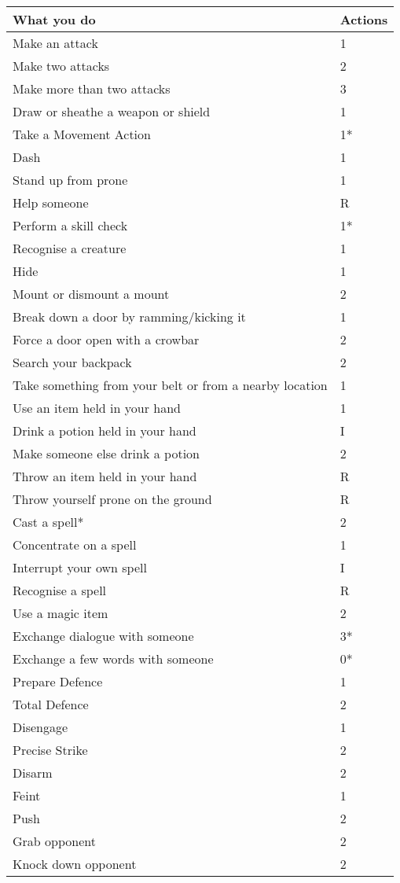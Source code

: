 \documentclass[landscape,10pt,a4paper]{article}
\begin{document}
\begin{multicols}{3}
\begin{dmbox}[title=Actions per Round - page \pageref{actionsintheround}]
\noindent\begin{tabular}{ll}
\textbf{What you do} & \textbf{Actions}\\
\hline
Make an attack& 1\\
Make two attacks& 2\\
Make more than two attacks& 3\\
Draw or sheathe a weapon or shield& 1\\
\hline
Take a Movement Action &1*\\
Dash & 1\\
Stand up from prone& 1\\
\hline
Help someone& R\\
Perform a skill check& 1*\\
Recognise a creature& 1\\
Hide& 1\\
\hline
Mount or dismount a mount& 2\\
Break down a door by ramming/kicking it& 1\\
Force a door open with a crowbar& 2\\
\hline
Search your backpack& 2\\
Take something from your belt or from a nearby location & 1\\
Use an item held in your hand& 1\\
\hline
Drink a potion held in your hand& I\\
Make someone else drink a potion & 2\\
\hline
Throw an item held in your hand& R\\
Throw yourself prone on the ground& R\\
\hline
Cast a spell*& 2\\
Concentrate on a spell& 1\\
Interrupt your own spell & I\\
Recognise a spell& R\\
Use a magic item& 2\\
\hline
Exchange dialogue with someone& 3*\\
Exchange a few words with someone& 0*\\
\hline
Prepare Defence & 1\\
Total Defence & 2\\
Disengage & 1\\
Precise Strike & 2\\
\hline
Disarm & 2\\
Feint & 1\\
Push & 2\\
Grab opponent & 2\\
Knock down opponent & 2
\end{tabular}
\end{dmbox}


\end{multicols}
\end{document}
